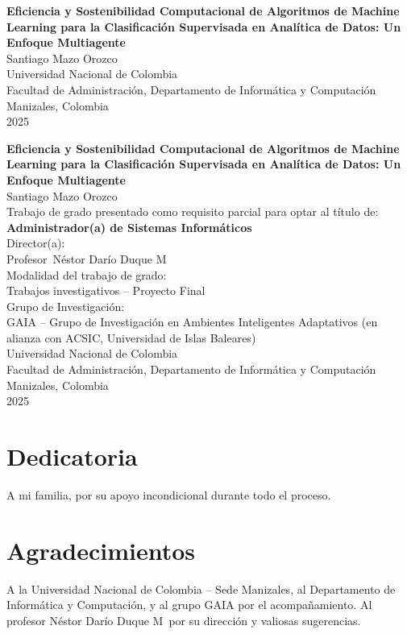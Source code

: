 \documentclass[12pt,twoside]{report}
\newcommand{\TrabajoTitulo}{Eficiencia y Sostenibilidad Computacional de Algoritmos de Machine Learning para la Clasificación Supervisada en Analítica de Datos: Un Enfoque Multiagente}
\newcommand{\AutorNombre}{Santiago Mazo Orozco}
\newcommand{\Universidad}{Universidad Nacional de Colombia}
\newcommand{\Facultad}{Facultad de Administración, Departamento de Informática y Computación}
\newcommand{\Ciudad}{Manizales, Colombia}
\newcommand{\Anio}{2025}
\newcommand{\GradoObjetivo}{Administrador(a) de Sistemas Informáticos}
\newcommand{\DirectorTitulo}{Profesor}
\newcommand{\DirectorNombre}{Néstor Darío Duque M}
\newcommand{\Modalidad}{Trabajos investigativos – Proyecto Final}
\newcommand{\GrupoInvestigacion}{GAIA – Grupo de Investigación en Ambientes Inteligentes Adaptativos (en alianza con ACSIC, Universidad de Islas Baleares)}
\begin{document}
\thispagestyle{empty}
\begin{center}
\vspace*{2cm}
{\LARGE \textbf{\TrabajoTitulo}\\[2cm]}
{\large \AutorNombre\\[2cm]}
{\large \Universidad\\}
\Facultad\\
\Ciudad\\[1cm]
\Anio
\end{center}
\clearpage

\thispagestyle{empty}
\begin{center}
\vspace*{2cm}
{\LARGE \textbf{\TrabajoTitulo}\\[2cm]}
{\large \AutorNombre\\[1.5cm]}
{\normalsize Trabajo de grado presentado como requisito parcial para optar al título de: \\
\textbf{\GradoObjetivo}\\[1.2cm]}
{\normalsize Director(a): \\ \DirectorTitulo\ \DirectorNombre \\[0.8cm]}
{\normalsize Modalidad del trabajo de grado: \\ \Modalidad \\[0.8cm]}
{\normalsize Grupo de Investigación: \\ \GrupoInvestigacion \\[1.2cm]}
{\large \Universidad\\}
\Facultad\\
\Ciudad\\[1cm]
\Anio
\end{center}
\clearpage

\chapter*{Dedicatoria}
A mi familia, por su apoyo incondicional durante todo el proceso.
\clearpage

\chapter*{Agradecimientos}
A la Universidad Nacional de Colombia – Sede Manizales, al Departamento de Informática y Computación, y al grupo GAIA por el acompañamiento. Al profesor \DirectorNombre~por su dirección y valiosas sugerencias.
\clearpage
\end{document}

